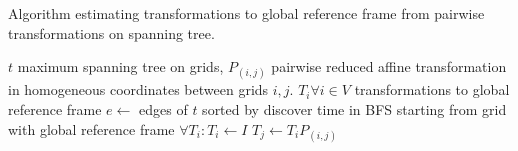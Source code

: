 \begin{algorithm}
    \caption{Algorithm estimating transformations to global reference frame from pairwise transformations on spanning tree.}
    \label{alg:estimatefinaltrans}
    \begin{algorithmic}[1]
        \Require $t$ maximum spanning tree on grids, $P_{(i,j)}$ pairwise reduced affine transformation in homogeneous coordinates between grids $i, j$.
        \Ensure $T_i \forall i \in V$ transformations to global reference frame
            \State $e \gets$ edges of $t$ sorted by discover time in \gls{BFS} starting from grid with global reference frame 
            \State $\forall T_i: T_i \gets I$ 
                $T_j \gets T_i P_{(i,j)}$
            \EndFor
        \EndProcedure
    \end{algorithmic}
\end{algorithm}

